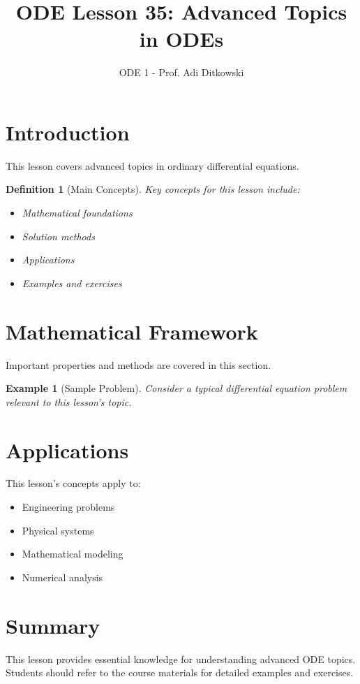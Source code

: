 \documentclass[12pt]{article}
\title{ODE Lesson 35: Advanced Topics in ODEs}
\author{ODE 1 - Prof. Adi Ditkowski}
\date{}
\newtheorem{definition}{Definition}
\newtheorem{example}{Example}
\begin{document}
\maketitle

\section{Introduction}

This lesson covers advanced topics in ordinary differential equations.

\begin{definition}[Main Concepts]
Key concepts for this lesson include:
\begin{itemize}
\item Mathematical foundations
\item Solution methods
\item Applications
\item Examples and exercises
\end{itemize}
\end{definition}

\section{Mathematical Framework}

\begin{keypoint}
Important properties and methods are covered in this section.
\end{keypoint}

\begin{example}[Sample Problem]
Consider a typical differential equation problem relevant to this lesson's topic.
\end{example}

\section{Applications}

This lesson's concepts apply to:
\begin{itemize}
\item Engineering problems
\item Physical systems
\item Mathematical modeling
\item Numerical analysis
\end{itemize}

\section{Summary}

This lesson provides essential knowledge for understanding advanced ODE topics.
Students should refer to the course materials for detailed examples and exercises.
\end{document}
